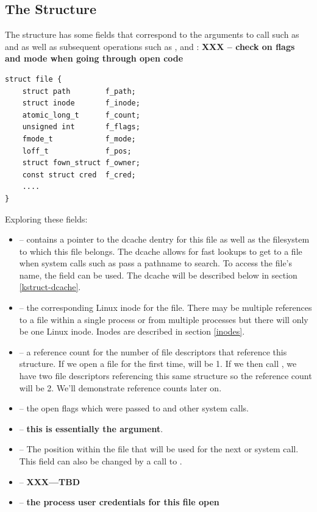 
\subsection{The  Structure}

The  structure has some fields that correspond to the arguments to  call such as  and  as well as subsequent operations such as ,  and : \textbf{XXX -- check on flags and mode when going through open code}

\begin{lstlisting}
struct file {
    struct path        f_path;   
    struct inode       f_inode;  
    atomic_long_t      f_count;  
    unsigned int       f_flags;  
    fmode_t            f_mode;   
    loff_t             f_pos;    
    struct fown_struct f_owner;  
    const struct cred  f_cred;   
    ....
}
\end{lstlisting}

\noindent
Exploring these fields:

\begin{itemize}
	\item {} -- contains a pointer to the dcache dentry for this file as well as the filesystem to which this file belongs. 
		The dcache allows for fast lookups to get to a file when system calls such as  pass a pathname to search. 
		To access the file's name, the field  can be used. The dcache will be described 
		below in section \ref{kstruct-dcache}.
	\item {} -- the corresponding Linux inode for the file. There may be multiple references
		to a file within a single process or from multiple processes but there will only be one Linux inode. Inodes are
		described in section \ref{inodes}.
	\item {} -- a reference count for the number of file descriptors that reference  this  structure. 
		If we open a file for the first time,  will be 1. If we then call , we have two file descriptors 
		referencing this same  structure so the reference count will be 2. We'll demonstrate reference counts later on.
	\item {} -- the open flags which were passed to  and other system calls. 
	\item {} -- {\bf this is essentially the  argument}.
	\item {} -- The position within the file that will be used for the next  or  system call. This 
		field can also be changed by a call to .
	\item {} -- {\bf XXX---TBD}
	\item {} -- {\bf the process user credentials for this file open}
\end{itemize}

